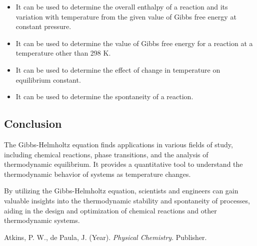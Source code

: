 \documentclass{article}
\begin{document}
\begin{itemize}

  \item It can be used to determine the overall enthalpy of a reaction and its variation with temperature from the given value of Gibbs free energy at constant pressure.
  \item It can be used to determine the value of Gibbs free energy for a reaction at a temperature other than 298 K.
  \item It can be used to determine the effect of change in temperature on equilibrium constant.
  \item It can be used to determine the spontaneity of a reaction.

\end{itemize}


\subsection{Conclusion}
The Gibbs-Helmholtz equation finds applications in various fields of study, including chemical reactions, phase transitions, and the analysis of thermodynamic equilibrium. It provides a quantitative tool to understand the thermodynamic behavior of systems as temperature changes.


By utilizing the Gibbs-Helmholtz equation, scientists and engineers can gain valuable insights into the thermodynamic stability and spontaneity of processes, aiding in the design and optimization of chemical reactions and other thermodynamic systems.

\begin{thebibliography}{1}
 Atkins, P. W., de Paula, J. (Year). \textit{Physical Chemistry}. Publisher.
\end{thebibliography}
\end{document}
